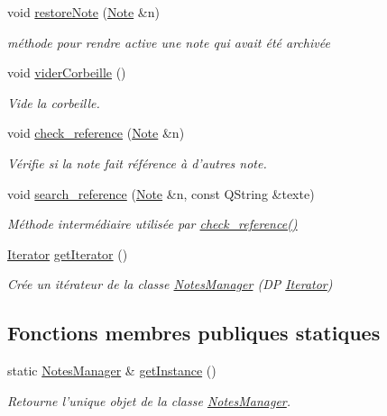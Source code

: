 \begin{DoxyCompactItemize}
void \hyperlink{class_notes_manager_a56476e587d2e904ce129483582113bb1}{restore\-Note} (\hyperlink{class_note}{Note} \&n)
\begin{DoxyCompactList}\small\item\em méthode pour rendre active une note qui avait été archivée \end{DoxyCompactList}\item 
\hypertarget{class_notes_manager_a624a4f618af06aaad53ed57dd2e924ad}{void \hyperlink{class_notes_manager_a624a4f618af06aaad53ed57dd2e924ad}{vider\-Corbeille} ()}\label{class_notes_manager_a624a4f618af06aaad53ed57dd2e924ad}

\begin{DoxyCompactList}\small\item\em Vide la corbeille. \end{DoxyCompactList}\item 
void \hyperlink{class_notes_manager_a93df3acfe88c13c3879b252912f9cde0}{check\-\_\-reference} (\hyperlink{class_note}{Note} \&n)
\begin{DoxyCompactList}\small\item\em Vérifie si la note fait référence à d'autres note. \end{DoxyCompactList}\item 
void \hyperlink{class_notes_manager_a998acbf3b81291c53d0f9158f18b06b3}{search\-\_\-reference} (\hyperlink{class_note}{Note} \&n, const Q\-String \&texte)
\begin{DoxyCompactList}\small\item\em Méthode intermédiaire utilisée par \hyperlink{class_notes_manager_a93df3acfe88c13c3879b252912f9cde0}{check\-\_\-reference()} \end{DoxyCompactList}\item 
\hyperlink{class_notes_manager_1_1_iterator}{Iterator} \hyperlink{class_notes_manager_a4907351a20cc85b1fe0327ac1b15c7da}{get\-Iterator} ()
\begin{DoxyCompactList}\small\item\em Crée un itérateur de la classe \hyperlink{class_notes_manager}{Notes\-Manager} (D\-P \hyperlink{class_notes_manager_1_1_iterator}{Iterator}) \end{DoxyCompactList}\end{DoxyCompactItemize}
\subsection*{Fonctions membres publiques statiques}
\begin{DoxyCompactItemize}
\item 
static \hyperlink{class_notes_manager}{Notes\-Manager} \& \hyperlink{class_notes_manager_a7311347da4088a6622955e46d53e7599}{get\-Instance} ()
\begin{DoxyCompactList}\small\item\em Retourne l'unique objet de la classe \hyperlink{class_notes_manager}{Notes\-Manager}. \end{DoxyCompactList}\end{DoxyCompactItemize}
